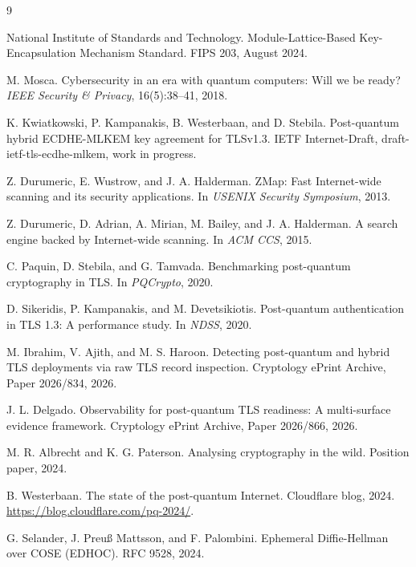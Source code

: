 \documentclass[11pt]{article}
\begin{document}
\begin{thebibliography}{9}

National Institute of Standards and Technology.
\newblock Module-Lattice-Based Key-Encapsulation Mechanism Standard.
\newblock FIPS 203, August 2024.

M. Mosca.
\newblock Cybersecurity in an era with quantum computers: Will we be ready?
\newblock \emph{IEEE Security \& Privacy}, 16(5):38--41, 2018.

K. Kwiatkowski, P. Kampanakis, B. Westerbaan, and D. Stebila.
\newblock Post-quantum hybrid ECDHE-MLKEM key agreement for TLSv1.3.
\newblock IETF Internet-Draft, draft-ietf-tls-ecdhe-mlkem, work in progress.

Z. Durumeric, E. Wustrow, and J. A. Halderman.
\newblock ZMap: Fast Internet-wide scanning and its security applications.
\newblock In \emph{USENIX Security Symposium}, 2013.

Z. Durumeric, D. Adrian, A. Mirian, M. Bailey, and J. A. Halderman.
\newblock A search engine backed by Internet-wide scanning.
\newblock In \emph{ACM CCS}, 2015.

C. Paquin, D. Stebila, and G. Tamvada.
\newblock Benchmarking post-quantum cryptography in TLS.
\newblock In \emph{PQCrypto}, 2020.

D. Sikeridis, P. Kampanakis, and M. Devetsikiotis.
\newblock Post-quantum authentication in TLS 1.3: A performance study.
\newblock In \emph{NDSS}, 2020.

M. Ibrahim, V. Ajith, and M. S. Haroon.
\newblock Detecting post-quantum and hybrid TLS deployments via raw TLS record
inspection.
\newblock Cryptology ePrint Archive, Paper 2026/834, 2026.

J. L. Delgado.
\newblock Observability for post-quantum TLS readiness: A multi-surface evidence
framework.
\newblock Cryptology ePrint Archive, Paper 2026/866, 2026.

M. R. Albrecht and K. G. Paterson.
\newblock Analysing cryptography in the wild.
\newblock Position paper, 2024.

B. Westerbaan.
\newblock The state of the post-quantum Internet.
\newblock Cloudflare blog, 2024. \url{https://blog.cloudflare.com/pq-2024/}.

G. Selander, J. Preu{\ss} Mattsson, and F. Palombini.
\newblock Ephemeral Diffie-Hellman over COSE (EDHOC).
\newblock RFC 9528, 2024.


\end{thebibliography}
\end{document}
